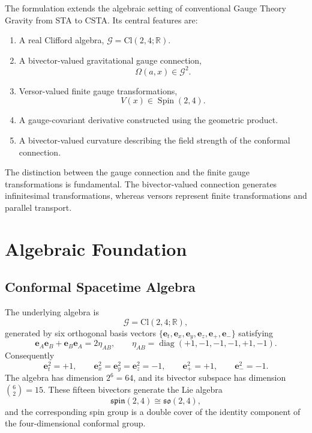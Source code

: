 \documentclass[11pt,a4paper]{article}
\newcommand{\Cl}{\mathrm{Cl}}
\newcommand{\R}{\mathbb{R}}
\newcommand{\Spin}{\operatorname{Spin}}
\newcommand{\so}{\mathfrak{so}}
\newcommand{\G}{\mathcal{G}}
\newcommand{\Om}{\Omega}
\newcommand{\e}{\mathbf{e}}
\begin{document}
The formulation extends the algebraic setting of conventional Gauge
Theory Gravity from STA to CSTA. Its central features are:

\begin{enumerate}
    \item A real Clifford algebra,
    \(
        \G=\Cl(2,4;\R).
    \)

    \item A bivector-valued gravitational gauge connection,
    \[
        \boxed{
            \Om(a,x)\in\G^2.
        }
    \]

    \item Versor-valued finite gauge transformations,
    \[
        \boxed{
            V(x)\in\Spin(2,4).
        }
    \]

    \item A gauge-covariant derivative constructed using the
    geometric product.

    \item A bivector-valued curvature describing the field strength
    of the conformal connection.
\end{enumerate}

The distinction between the gauge connection and the finite gauge
transformations is fundamental. The bivector-valued connection
generates infinitesimal transformations, whereas versors represent
finite transformations and parallel transport.

\section{Algebraic Foundation}
\label{sec:algebra}

\subsection{Conformal Spacetime Algebra}

The underlying algebra is
\[
    \G=\Cl(2,4;\R),
\]
generated by six orthogonal basis vectors
\(
    \{\e_t,\e_x,\e_y,\e_z,\e_+,\e_-\}
\)
satisfying
\[
    \e_A\e_B+\e_B\e_A=2\eta_{AB},
    \qquad
    \eta_{AB}=\operatorname{diag}(+1,-1,-1,-1,+1,-1).
\]
Consequently
\[
    \e_t^2=+1,\qquad
    \e_x^2=\e_y^2=\e_z^2=-1,\qquad
    \e_+^2=+1,\qquad
    \e_-^2=-1.
\]
The algebra has dimension \(2^6=64\), and its bivector subspace has
dimension \(\binom{6}{2}=15\). These fifteen bivectors generate the
Lie algebra
\[
    \mathfrak{spin}(2,4)\cong\so(2,4),
\]
and the corresponding spin group is a double cover of the identity
component of the four-dimensional conformal group.
\end{document}
